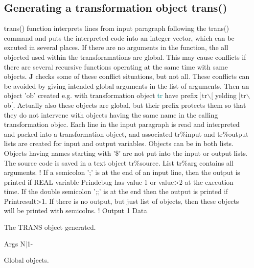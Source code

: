 \subsection{Generating a transformation object \textcolor{VioletRed}{trans}()}
\label{trans}
\textcolor{VioletRed}{trans}() function interprets lines from input paragraph following the \textcolor{VioletRed}{trans}() command and puts the
interpreted code into an integer vector, which can be excuted in several places.
If there are no arguments in the function, the all objected used within the
transforamations are global. This may cause conflicts if there are several recursive
functions operating at the same time with same objects. \textbf{J} checks some of
these conflict situations, but not all.  These conflicts can be avoided by giving
intended global arguments  in the list of arguments.
Then an object 'ob' created e.g. with transformation object \textcolor{teal}{tr} have prefix
]tr$\backslash$[ yelding ]tr$\backslash$ob[. Actually also these objects are global, but their prefix
protects them so that they do not intervene with objects having the same name in the
calling transformation objec.
Each line in the input paragraph is read and interpreted and packed into a transformation
object, and associated tr\%input and tr\%output lists are created for input and output
variables. Objects can be in both lists. Objects having names starting
with '\$' are not put into the input or output lists. The source code is saved in a text object
tr\%source. List tr\%arg contains all arguments.
!
If a semicolon ';'  is at the end of an input line, then
the output is printed if REAL variable Prindebug has value 1 or value>2 at
the execution time. If the double semicolon ';;' is at the end then the output is
printed if Printresult>1. If there is no output, but just list of objects, then these
objects will be printed with semicolns.
!
\vspace{0.3cm}
\hline
\vspace{0.3cm}
\noindent Output \tabto{3cm} 1 \tabto{5cm}  Data \tabto{7cm}
\begin{changemargin}{3cm}{0cm}
\noindent The TRANS object generated.
\end{changemargin}
\vspace{0.3cm}
\hline
\vspace{0.3cm}
\noindent Args \tabto{3cm} N|1- \tabto{5cm}    \tabto{7cm}
\begin{changemargin}{3cm}{0cm}
\noindent  Global objects.
\end {changemargin}
\hline
